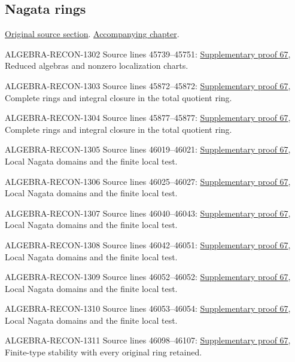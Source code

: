 \subsection{Nagata rings}
\hypertarget{algebra-source-section-nagata}{}
\noindent\href{https://github.com/stacks/stacks-project/blob/a04446e57ec1fbc252a871afcec7752fb2807b14/algebra.tex\#L45615}{Original source section}. \href{algebra.pdf\#nameddest=section-nagata}{Accompanying chapter}.

\begin{AlgebraSourceRoutes}
\item[ALGEBRA-RECON-1302] Source lines 45739--45751: \hyperlink{algebra_nagata_notes_20260929}{Supplementary proof 67}, Reduced algebras and nonzero localization charts.
\item[ALGEBRA-RECON-1303] Source lines 45872--45872: \hyperlink{algebra_nagata_notes_20260929}{Supplementary proof 67}, Complete rings and integral closure in the total quotient ring.
\item[ALGEBRA-RECON-1304] Source lines 45877--45877: \hyperlink{algebra_nagata_notes_20260929}{Supplementary proof 67}, Complete rings and integral closure in the total quotient ring.
\item[ALGEBRA-RECON-1305] Source lines 46019--46021: \hyperlink{algebra_nagata_notes_20260929}{Supplementary proof 67}, Local Nagata domains and the finite local test.
\item[ALGEBRA-RECON-1306] Source lines 46025--46027: \hyperlink{algebra_nagata_notes_20260929}{Supplementary proof 67}, Local Nagata domains and the finite local test.
\item[ALGEBRA-RECON-1307] Source lines 46040--46043: \hyperlink{algebra_nagata_notes_20260929}{Supplementary proof 67}, Local Nagata domains and the finite local test.
\item[ALGEBRA-RECON-1308] Source lines 46042--46051: \hyperlink{algebra_nagata_notes_20260929}{Supplementary proof 67}, Local Nagata domains and the finite local test.
\item[ALGEBRA-RECON-1309] Source lines 46052--46052: \hyperlink{algebra_nagata_notes_20260929}{Supplementary proof 67}, Local Nagata domains and the finite local test.
\item[ALGEBRA-RECON-1310] Source lines 46053--46054: \hyperlink{algebra_nagata_notes_20260929}{Supplementary proof 67}, Local Nagata domains and the finite local test.
\item[ALGEBRA-RECON-1311] Source lines 46098--46107: \hyperlink{algebra_nagata_notes_20260929}{Supplementary proof 67}, Finite-type stability with every original ring retained.

\end{AlgebraSourceRoutes}
